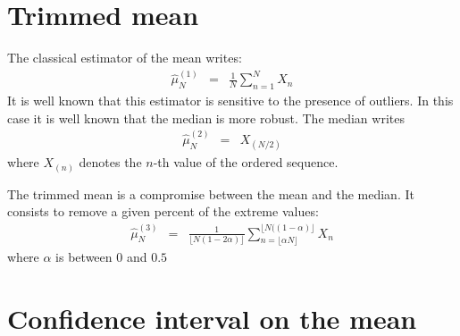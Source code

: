 
\section{Trimmed mean}
The classical estimator of the mean writes:
\begin{eqnarray*}
\hat \mu^{(1)}_{N} &=&\frac{1}{N}\sum_{n=1}^{N}X_{n}
\end{eqnarray*}
It is well known that this estimator is sensitive to the presence of outliers. In this case it is well known that the median is more robust. The median writes
\begin{eqnarray*}
\hat \mu^{(2)}_{N} &=&X_{(N/2)}
\end{eqnarray*}
where $X_{(n)}$ denotes the $n$-th value of the ordered sequence.

The trimmed mean is a compromise between the mean and the median. It consists to remove a given percent of the extreme values:
\begin{eqnarray*}
\hat \mu^{(3)}_{N} &=&\frac{1}{\lfloor N(1-2\alpha)\rfloor}\sum_{n=\lfloor \alpha N \rfloor }^{\lfloor N((1-\alpha)\rfloor }X_{n}
\end{eqnarray*}
where $\alpha$ is between $0$ and $0.5$

\section{Confidence interval on the mean}

